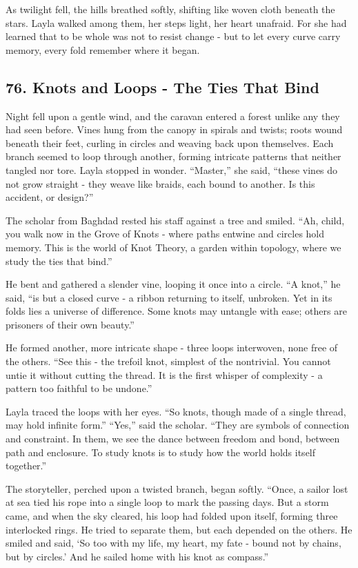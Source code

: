 \documentclass[
  letterpaper,
  DIV=11,
  numbers=noendperiod]{scrreprt}
\begin{document}
As twilight fell, the hills breathed softly, shifting like woven cloth
beneath the stars. Layla walked among them, her steps light, her heart
unafraid. For she had learned that to be whole was not to resist change
- but to let every curve carry memory, every fold remember where it
began.

\subsection{76. Knots and Loops - The Ties That
Bind}\label{knots-and-loops---the-ties-that-bind}

Night fell upon a gentle wind, and the caravan entered a forest unlike
any they had seen before. Vines hung from the canopy in spirals and
twists; roots wound beneath their feet, curling in circles and weaving
back upon themselves. Each branch seemed to loop through another,
forming intricate patterns that neither tangled nor tore. Layla stopped
in wonder. ``Master,'' she said, ``these vines do not grow straight -
they weave like braids, each bound to another. Is this accident, or
design?''

The scholar from Baghdad rested his staff against a tree and smiled.
``Ah, child, you walk now in the Grove of Knots - where paths entwine
and circles hold memory. This is the world of Knot Theory, a garden
within topology, where we study the ties that bind.''

He bent and gathered a slender vine, looping it once into a circle. ``A
knot,'' he said, ``is but a closed curve - a ribbon returning to itself,
unbroken. Yet in its folds lies a universe of difference. Some knots may
untangle with ease; others are prisoners of their own beauty.''

He formed another, more intricate shape - three loops interwoven, none
free of the others. ``See this - the trefoil knot, simplest of the
nontrivial. You cannot untie it without cutting the thread. It is the
first whisper of complexity - a pattern too faithful to be undone.''

Layla traced the loops with her eyes. ``So knots, though made of a
single thread, may hold infinite form.'' ``Yes,'' said the scholar.
``They are symbols of connection and constraint. In them, we see the
dance between freedom and bond, between path and enclosure. To study
knots is to study how the world holds itself together.''

The storyteller, perched upon a twisted branch, began softly. ``Once, a
sailor lost at sea tied his rope into a single loop to mark the passing
days. But a storm came, and when the sky cleared, his loop had folded
upon itself, forming three interlocked rings. He tried to separate them,
but each depended on the others. He smiled and said, `So too with my
life, my heart, my fate - bound not by chains, but by circles.' And he
sailed home with his knot as compass.''
\end{document}
